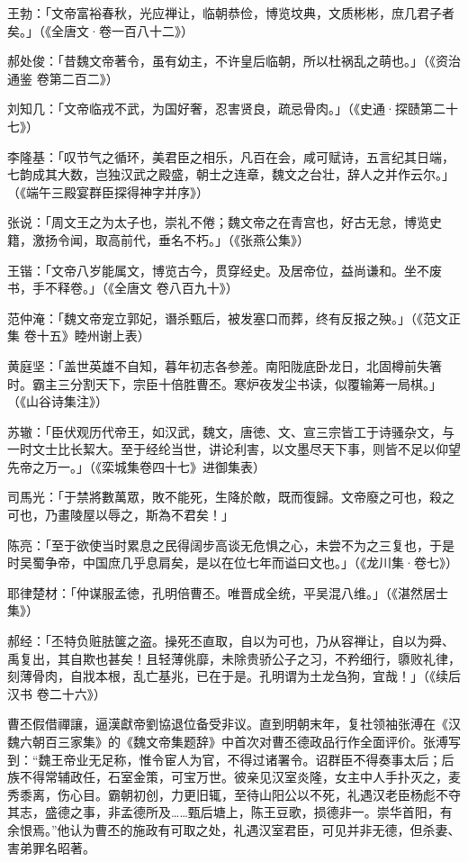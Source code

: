 王勃：「文帝富裕春秋，光应禅让，临朝恭俭，博览坟典，文质彬彬，庶几君子者矣。」（《全唐文·卷一百八十二》）

郝处俊：「昔魏文帝著令，虽有幼主，不许皇后临朝，所以杜祸乱之萌也。」（《资治通鉴 卷第二百二》）

刘知几：「文帝临戎不武，为国好奢，忍害贤良，疏忌骨肉。」（《史通·探赜第二十七》）

李隆基：「叹节气之循环，美君臣之相乐，凡百在会，咸可赋诗，五言纪其日端，七韵成其大数，岂独汉武之殿盛，朝士之连章，魏文之台壮，辞人之并作云尔。」（《端午三殿宴群臣探得神字并序》）

张说：「周文王之为太子也，崇礼不倦；魏文帝之在青宫也，好古无怠，博览史籍，激扬令闻，取高前代，垂名不朽。」（《张燕公集》）

王锴：「文帝八岁能属文，博览古今，贯穿经史。及居帝位，益尚谦和。坐不废书，手不释卷。」（《全唐文 卷八百九十》）

范仲淹：「魏文帝宠立郭妃，谮杀甄后，被发塞口而葬，终有反报之殃。」（《范文正集 卷十五》睦州谢上表）

黄庭坚：「盖世英雄不自知，暮年初志各参差。南阳陇底卧龙日，北固樽前失箸时。霸主三分割天下，宗臣十倍胜曹丕。寒炉夜发尘书读，似覆输筹一局棋。」（《山谷诗集注》）

苏辙：「臣伏观历代帝王，如汉武，魏文，唐徳、文、宣三宗皆工于诗骚杂文，与一时文士比长絜大。至于经纶当世，讲论利害，以文墨尽天下事，则皆不足以仰望先帝之万一。」（《栾城集卷四十七》进御集表）

司馬光：「于禁將數萬眾，敗不能死，生降於敵，既而復歸。文帝廢之可也，殺之可也，乃畫陵屋以辱之，斯為不君矣！」

陈亮：「至于欲使当时累息之民得阔步高谈无危惧之心，未尝不为之三复也，于是时吴蜀争帝，中国庶几乎息肩矣，是以在位七年而谥曰文也。」（《龙川集·卷七》）

耶律楚材：「仲谋服孟徳，孔明倍曹丕。唯晋成全统，平吴混八维。」（《湛然居士集》）

郝经：「丕特负赃胠箧之盗。操死丕直取，自以为可也，乃从容禅让，自以为舜、禹复出，其自欺也甚矣！且轻薄佻靡，未除贵骄公子之习，不矜细行，隳败礼律，刻薄骨肉，自戕本根，乱亡基兆，已在于是。孔明谓为土龙刍狗，宜哉！」（《续后汉书 卷二十六》）

曹丕假借禪讓，逼漢獻帝劉協退位备受非议。直到明朝末年，复社领袖张溥在《汉魏六朝百三家集》的《魏文帝集题辞》中首次对曹丕德政品行作全面评价。张溥写到：“魏王帝业无足称，惟令宦人为官，不得过诸署令。诏群臣不得奏事太后；后族不得常辅政任，石室金策，可宝万世。彼亲见汉室炎隆，女主中人手扑灭之，麦秀黍离，伤心目。霸朝初创，力更旧辄，至待山阳公以不死，礼遇汉老臣杨彪不夺其志，盛德之事，非孟德所及……甄后塘上，陈王豆歌，损德非一。崇华首阳，有余恨焉。”他认为曹丕的施政有可取之处，礼遇汉室君臣，可见并非无德，但杀妻、害弟罪名昭著。

